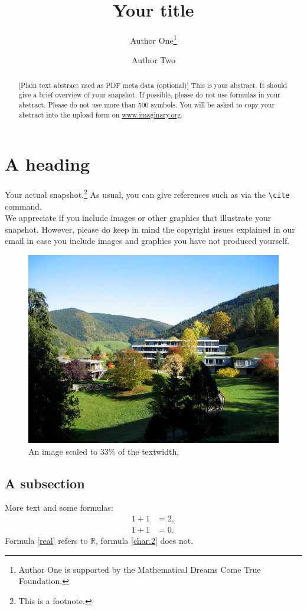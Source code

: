 \documentclass{snapshotmfo}
\author{Author One\thanks{Author One is supported by the Mathematical Dreams Come True Foundation.} \and Author Two}
\title{Your title}
\begin{document}
\begin{abstract}[Plain text abstract used as PDF meta data (optional)]
This is your abstract. It should give a brief overview of your snapshot. If possible, please do not use formulas in your abstract. Please do not use more than 500 symbols. You will be asked to copy your abstract into the upload form on \href{http://www.imaginary.org}{www.imaginary.org}. 
\end{abstract}

\section{A heading}
Your actual snapshot.\footnote{This is a footnote.} As usual, you can give references such as \cite{snapshot, knuth1984texbook, wikiMath, sample13, sample12, sample11, sample14} via the \verb+\cite+ command.\\

We appreciate if you include images or other graphics that illustrate your snapshot. However, please do keep in mind the copyright issues explained in our email in case you include images and graphics you have not produced yourself.

\begin{figure}[ht]
        \centering 
        \includegraphics[width= 0.33 \textwidth]{mfo.jpg}
        \caption{An image scaled to 33\% of the textwidth.}
\label{fig:sample-image}
\end{figure}

\subsection{A subsection}
More text and some formulas:
\begin{align}\label{real}
1+1&=2,\\\label{char.2}
1+1&=0.
\end{align}
Formula \eqref{real} refers to $\mathbb{R}$, formula \eqref{char.2} does not.
\end{document}
